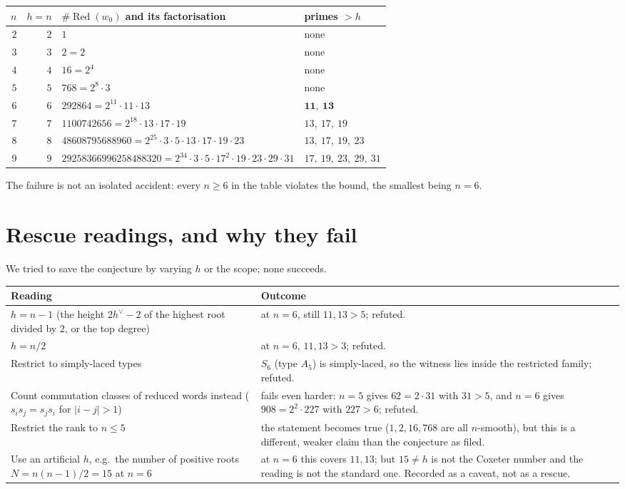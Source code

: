 \documentclass[11pt]{article}
\theoremstyle{definition}
\theoremstyle{remark}
\newcommand{\Red}{\operatorname{Red}}
\begin{document}
\begin{center}
\begin{tabular}{r r l l}
\toprule
$n$ & $h = n$ & $\#\Red(w_0)$ and its factorisation & primes $> h$ \\
\midrule
$2$ & $2$ & $1$ & none \\
$3$ & $3$ & $2 = 2$ & none \\
$4$ & $4$ & $16 = 2^4$ & none \\
$5$ & $5$ & $768 = 2^8\cdot 3$ & none \\
$6$ & $6$ & $292864 = 2^{11}\cdot 11\cdot 13$ & $\mathbf{11,\ 13}$ \\
$7$ & $7$ & $1100742656 = 2^{18}\cdot 13\cdot 17\cdot 19$ & $13,\ 17,\ 19$ \\
$8$ & $8$ & $48608795688960 = 2^{25}\cdot 3\cdot 5\cdot 13\cdot 17\cdot 19\cdot 23$
        & $13,\ 17,\ 19,\ 23$ \\
$9$ & $9$ &
  $29258366996258488320 = 2^{34}\cdot 3\cdot 5\cdot 17^2\cdot 19\cdot 23\cdot 29\cdot 31$
  & $17,\ 19,\ 23,\ 29,\ 31$ \\
\bottomrule
\end{tabular}
\end{center}

The failure is not an isolated accident: every $n\ge 6$ in the table
violates the bound, the smallest being $n = 6$.

\section{Rescue readings, and why they fail}\label{sec:rescues}

We tried to save the conjecture by varying $h$ or the scope; none succeeds.

\begin{center}
\begin{tabular}{p{} p{}}
\toprule
Reading & Outcome \\
\midrule
$h = n - 1$ (the height $2h^\vee - 2$ of the highest root divided by $2$, or
  the top degree) & at $n = 6$, still $11, 13 > 5$; refuted. \\
$h = n/2$ & at $n = 6$, $11,13 > 3$; refuted. \\
Restrict to simply-laced types & $S_6$ (type $A_5$) is simply-laced, so the
  witness lies inside the restricted family; refuted. \\
Count commutation classes of reduced words instead
  ($s_is_j = s_js_i$ for $|i-j|>1$) & fails even harder: $n = 5$ gives
  $62 = 2\cdot 31$ with $31 > 5$, and $n = 6$ gives $908 = 2^2\cdot 227$ with
  $227 > 6$; refuted. \\
Restrict the rank to $n \le 5$ & the statement becomes true
  ($1,2,16,768$ are all $n$-smooth), but this is a different, weaker claim
  than the conjecture as filed. \\
Use an artificial $h$, e.g.\ the number of positive roots $N = n(n-1)/2 = 15$
  at $n = 6$ & at $n = 6$ this covers $11, 13$; but $15 \ne h$ is not the
  Coxeter number and the reading is not the standard one. Recorded as a
  caveat, not as a rescue. \\
\bottomrule
\end{tabular}
\end{center}
\end{document}
